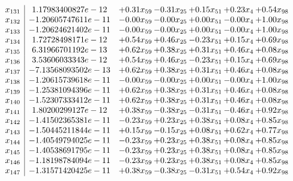 \documentclass[8pt]{article}
\begin{document}
\[\begin{array}{c| c c@{\hskip 2pt} c@{\hskip 2pt} c@{\hskip 2pt} c@{\hskip 2pt} c@{\hskip 2pt} }
 x_{131}   &  1.17983400827e-12 & +  0.31 x_{59} & -0.31 x_{25} & +  0.15 x_{51} & +  0.23 x_{4} & +  0.54 x_{98}\\
 x_{132}   &  -1.20605747611e-11 & -0.00 x_{59} & -0.00 x_{25} & +  0.00 x_{51} & -0.00 x_{4} & +  1.00 x_{98}\\
 x_{133}   &  -1.20624621402e-11 & -0.00 x_{59} & -0.00 x_{25} & +  0.00 x_{51} & -0.00 x_{4} & +  1.00 x_{98}\\
 x_{134}   &  1.72728498171e-12 & +  0.54 x_{59} & +  0.46 x_{25} & -0.23 x_{51} & +  0.15 x_{4} & +  0.69 x_{98}\\
 x_{135}   &  6.31966701192e-13 & +  0.62 x_{59} & +  0.38 x_{25} & +  0.31 x_{51} & +  0.46 x_{4} & +  0.08 x_{98}\\
 x_{136}   &  3.53606033343e-12 & +  0.54 x_{59} & +  0.46 x_{25} & -0.23 x_{51} & +  0.15 x_{4} & +  0.69 x_{98}\\
 x_{137}   &  -7.13568093502e-13 & +  0.62 x_{59} & +  0.38 x_{25} & +  0.31 x_{51} & +  0.46 x_{4} & +  0.08 x_{98}\\
 x_{138}   &  -1.20615739618e-11 & -0.00 x_{59} & -0.00 x_{25} & +  0.00 x_{51} & -0.00 x_{4} & +  1.00 x_{98}\\
 x_{139}   &  -1.25381094396e-11 & +  0.62 x_{59} & +  0.38 x_{25} & +  0.31 x_{51} & +  0.46 x_{4} & +  0.08 x_{98}\\
 x_{140}   &  -1.52307333412e-11 & +  0.62 x_{59} & +  0.38 x_{25} & +  0.31 x_{51} & +  0.46 x_{4} & +  0.08 x_{98}\\
 x_{141}   &  1.80200299127e-12 & +  0.38 x_{59} & -0.38 x_{25} & -0.31 x_{51} & -0.46 x_{4} & +  0.92 x_{98}\\
 x_{142}   &  -1.41502365381e-11 & -0.23 x_{59} & +  0.23 x_{25} & +  0.38 x_{51} & +  0.08 x_{4} & +  0.85 x_{98}\\
 x_{143}   &  -1.50445211844e-11 & +  0.15 x_{59} & -0.15 x_{25} & +  0.08 x_{51} & +  0.62 x_{4} & +  0.77 x_{98}\\
 x_{144}   &  -1.40549794025e-11 & -0.23 x_{59} & +  0.23 x_{25} & +  0.38 x_{51} & +  0.08 x_{4} & +  0.85 x_{98}\\
 x_{145}   &  -1.40538691795e-11 & -0.23 x_{59} & +  0.23 x_{25} & +  0.38 x_{51} & +  0.08 x_{4} & +  0.85 x_{98}\\
 x_{146}   &  -1.18198784094e-11 & -0.23 x_{59} & +  0.23 x_{25} & +  0.38 x_{51} & +  0.08 x_{4} & +  0.85 x_{98}\\
 x_{147}   &  -1.31571420425e-11 & +  0.38 x_{59} & -0.38 x_{25} & -0.31 x_{51} & +  0.54 x_{4} & +  0.92 x_{98}\\

\end{array}\]
\end{document}
